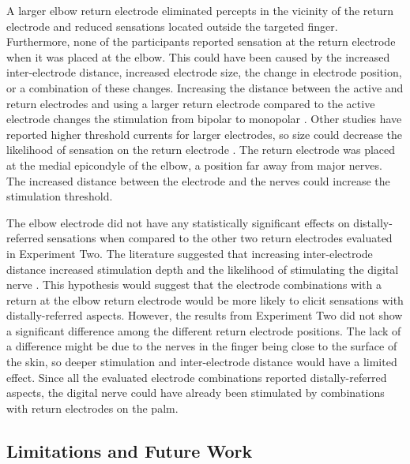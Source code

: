 \documentclass[10pt]{iopart}
\begin{document}
A larger elbow return electrode eliminated percepts in the vicinity of the return electrode and reduced sensations located outside the targeted finger. Furthermore, none of the participants reported sensation at the return electrode when it was placed at the elbow. This could have been caused by the increased inter-electrode distance, increased electrode size, the change in electrode position, or a combination of these changes. Increasing the distance between the active and return electrodes and using a larger return electrode compared to the active electrode changes the stimulation from bipolar to monopolar \cite{plonsey_bioelectricity_2007,north_glossary_2022}. Other studies have reported higher threshold currents for larger electrodes, so size could decrease the likelihood of sensation on the return electrode \cite{cao_3-d_2014, gomez-tames_simulation_2012}. The return electrode was placed at the medial epicondyle of the elbow, a position far away from major nerves. The increased distance between the electrode and the nerves could increase the stimulation threshold.

The elbow electrode did not have any statistically significant effects on distally-referred sensations when compared to the other two return electrodes evaluated in Experiment Two. The literature suggested that increasing inter-electrode distance increased stimulation depth and the likelihood of stimulating the digital nerve \cite{gomez-tames_simulation_2012, kajimoto_electro-tactile_2016, tanaka_full-hand_2023}. This hypothesis would suggest that the electrode combinations with a return at the elbow return electrode would be more likely to elicit sensations with distally-referred aspects. However, the results from Experiment Two did not show a significant difference among the different return electrode positions. The lack of a difference might be due to the nerves in the finger being close to the surface of the skin, so deeper stimulation and inter-electrode distance would have a limited effect. Since all the evaluated electrode combinations reported distally-referred aspects, the digital nerve could have already been stimulated by combinations with return electrodes on the palm. 

\subsection{Limitations and Future Work}
\end{document}

